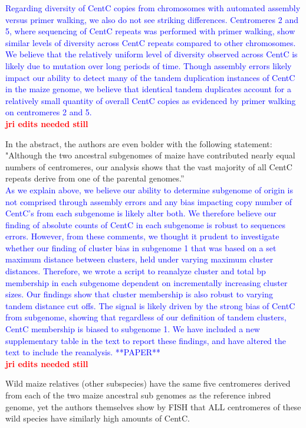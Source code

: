 \documentclass[]{article}
\newcommand{\res}[1]{\noindent \textcolor{blue}{{#1}} \\}
\newcommand{\jri}[1]{\textcolor{red}{{\bf #1}} }
\begin{document}
\res{Regarding diversity of CentC copies from chromosomes with automated assembly versus primer walking, we also do not see striking differences.  
Centromeres 2 and 5, where sequencing of CentC repeats was performed with primer walking, show similar levels of diversity across CentC repeats compared to other chromosomes.  
We believe that the relatively uniform level of diversity observed across CentC is likely due to mutation over long periods of time.  
Though assembly errors likely impact our ability to detect many of the tandem duplication instances of CentC in the maize genome, we believe that identical tandem duplicates account for a relatively small quantity of overall CentC copies as evidenced by primer walking on centromeres 2 and 5. }\jri{jri edits needed still}

In the abstract, the authors are even bolder with the following statement: "Although the two ancestral subgenomes of maize have contributed nearly equal numbers of centromeres, our analysis shows that the vast majority of all CentC repeats derive from one of the parental genomes.”\\

\res{As we explain above, we believe our ability to determine subgenome of origin is not comprised through assembly errors and any bias impacting copy number of CentC’s from each subgenome is likely alter both.  
We therefore believe our finding of absolute counts of CentC in each subgenome is robust to sequences errors.  
However, from these comments, we thought it prudent to investigate whether our finding of cluster bias in subgenome 1 that was based on a set maximum distance between clusters, held under varying maximum cluster distances.  
Therefore, we wrote a script to reanalyze cluster and total bp membership in each subgenome dependent on incrementally increasing cluster sizes.
Our findings show that cluster membership is also robust to varying tandem distance cut offs.
The signal is likely driven by the strong bias of CentC from subgenome, showing that regardless of our definition of tandem clusters, CentC membership is biased to subgenome 1.
We have included a new supplementary table in the text to report these findings, and have altered the text to include the reanalysis.  **PAPER**}\jri{jri edits needed still}

Wild maize relatives (other subspecies) have the same five centromeres derived from each of the two maize ancestral sub genomes as the reference inbred genome, yet the authors themselves show by FISH that ALL centromeres of these wild species have similarly high amounts of CentC.\\
\end{document}

